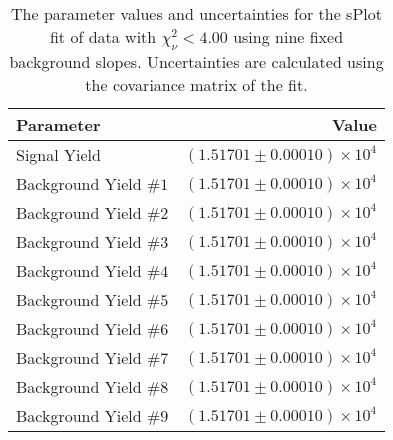 
\begin{table}[ht]
    \begin{center}
        \begin{tabular}{lr}\toprule
            Parameter & Value \\\midrule
            Signal Yield & $(1.51701 \pm 0.00010) \times 10^{4}$ \\
            Background Yield $\#1$ & $(1.51701 \pm 0.00010) \times 10^{4}$ \\
            Background Yield $\#2$ & $(1.51701 \pm 0.00010) \times 10^{4}$ \\
            Background Yield $\#3$ & $(1.51701 \pm 0.00010) \times 10^{4}$ \\
            Background Yield $\#4$ & $(1.51701 \pm 0.00010) \times 10^{4}$ \\
            Background Yield $\#5$ & $(1.51701 \pm 0.00010) \times 10^{4}$ \\
            Background Yield $\#6$ & $(1.51701 \pm 0.00010) \times 10^{4}$ \\
            Background Yield $\#7$ & $(1.51701 \pm 0.00010) \times 10^{4}$ \\
            Background Yield $\#8$ & $(1.51701 \pm 0.00010) \times 10^{4}$ \\
            Background Yield $\#9$ & $(1.51701 \pm 0.00010) \times 10^{4}$ \\\bottomrule
        \end{tabular}
        \caption{The parameter values and uncertainties for the sPlot fit of data with $\chi^2_\nu < 4.00$ using nine fixed background slopes. Uncertainties are calculated using the covariance matrix of the fit.}\label{tab:splot-fit-results-chisqdof-4.00-fixed-9}
    \end{center}
\end{table}
